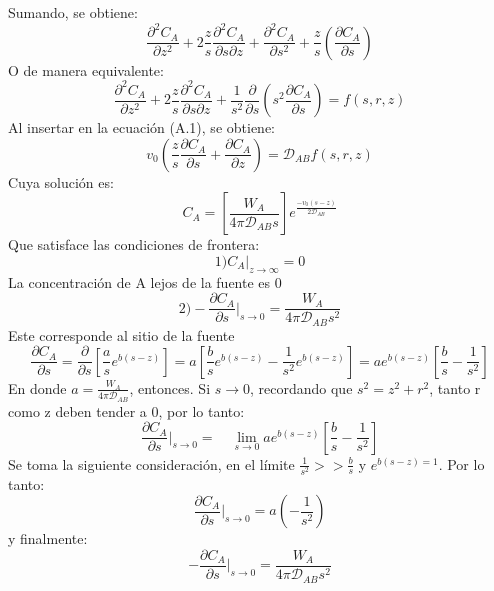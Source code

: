 Sumando, se obtiene:
\begin{equation*}
    \frac{\partial^2C_A}{\partial z^2}+2\frac{z}{s}\frac{\partial^2C_A}{\partial s \partial z}+\frac{\partial^2C_A}{\partial s^2}+\frac{z}{s}(\frac{\partial C_A}{\partial s})
\end{equation*}
O de manera equivalente:
\begin{equation*}
    \frac{\partial^2C_A}{\partial z^2}+2\frac{z}{s}\frac{\partial^2C_A}{\partial s \partial z}+\frac{1}{s^2}\frac{\partial}{\partial s}(s^2\frac{\partial C_A}{\partial s})=f(s,r,z)
\end{equation*}
Al insertar en la ecuación (A.1), se obtiene:
\begin{equation*}
    v_0(\frac{z}{s}\frac{\partial C_A}{\partial s}+\frac{\partial C_A}{\partial z})=\mathscr{D}_{AB}f(s,r,z)
\end{equation*}
Cuya solución es:
\begin{equation}
    C_A=[\frac{W_A}{4\pi \mathscr{D}_{AB}s}]e^{\frac{-v_0(s-z)}{2\mathscr{D}_{AB}}}
\end{equation}
Que satisface las condiciones de frontera:
\begin{equation*}
    1) C_A|_{z \rightarrow \infty}=0 
\end{equation*}
La concentración de A lejos de la fuente es 0
\begin{equation*}
    2) -\frac{\partial C_A}{\partial s}|_{s \rightarrow0}=\frac{W_A}{4\pi \mathscr{D}_{AB}s^2}
\end{equation*}
Este corresponde al sitio de la fuente
\begin{equation*}
    \frac{\partial C_A}{\partial s}=\frac{\partial}{\partial s}[\frac{a}{s}e^{b(s-z)}]=a[\frac{b}{s}e^{b(s-z)}-\frac{1}{s^2}e^{b(s-z)}]=ae^{b(s-z)}[\frac{b}{s}-\frac{1}{s^2}]
\end{equation*}
En donde $a=\frac{W_A}{4\pi \mathscr{D}_{AB}}$, entonces. Si $s\rightarrow 0$, recordando que $s^2=z^2+r^2$, tanto r como z deben tender a 0, por lo tanto:
\begin{equation*}
    \frac{\partial C_A}{\partial s}|_{s\rightarrow 0}=\quad\lim_{s\rightarrow0}ae^{b(s-z)}[\frac{b}{s}-\frac{1}{s^2}]
\end{equation*}
Se toma la siguiente consideración, en el límite $\frac{1}{s^2}>>\frac{b}{s}$ y $e^{b(s-z)=1}$. Por lo tanto:
\begin{equation*}
     \frac{\partial C_A}{\partial s}|_{s\rightarrow 0}=a(-\frac{1}{s^2})
\end{equation*}
y finalmente:
\begin{equation*}
   -\frac{\partial C_A}{\partial s}|_{s\rightarrow 0}=\frac{W_A}{4\pi \mathscr{D}_{AB}s^2} 
\end{equation*}
